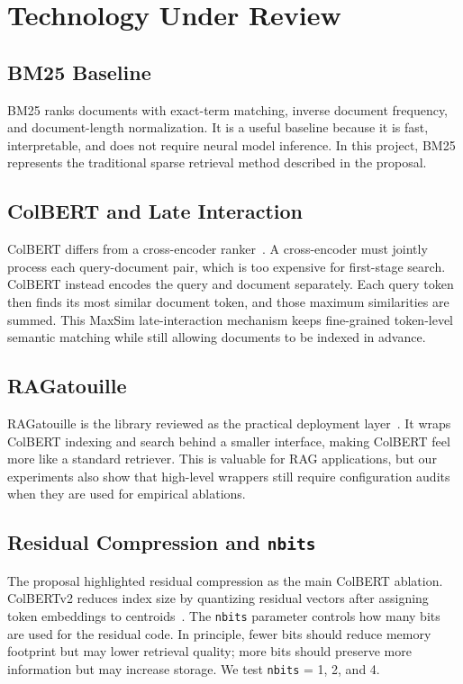 \documentclass[sigconf,nonacm]{acmart}
\begin{document}
\section{Technology Under Review}

\subsection{BM25 Baseline}

BM25 ranks documents with exact-term matching, inverse document frequency, and
document-length normalization. It is a useful baseline because it is fast,
interpretable, and does not require neural model inference. In this project,
BM25 represents the traditional sparse retrieval method described in the
proposal.

\subsection{ColBERT and Late Interaction}

ColBERT differs from a cross-encoder ranker~\cite{khattab2020colbert}. A
cross-encoder must jointly process each query-document pair, which is too
expensive for first-stage search. ColBERT instead encodes the query and document
separately. Each query token then finds its most similar document token, and
those maximum similarities are summed. This MaxSim late-interaction mechanism
keeps fine-grained token-level semantic matching while still allowing documents
to be indexed in advance.

\subsection{RAGatouille}

RAGatouille is the library reviewed as the practical deployment
layer~\cite{ragatouille}. It wraps ColBERT indexing and search behind a smaller
interface, making ColBERT feel more like a standard retriever. This is valuable
for RAG applications, but our experiments also show that high-level wrappers
still require configuration audits when they are used for empirical ablations.

\subsection{Residual Compression and \texttt{nbits}}

The proposal highlighted residual compression as the main ColBERT ablation.
ColBERTv2 reduces index size by quantizing residual vectors after assigning
token embeddings to centroids~\cite{santhanam2022colbertv2}. The
\texttt{nbits} parameter controls how many bits are used for the residual code.
In principle, fewer bits should reduce memory footprint but may lower retrieval
quality; more bits should preserve more information but may increase storage. We
test \texttt{nbits} = 1, 2, and 4.
\end{document}
